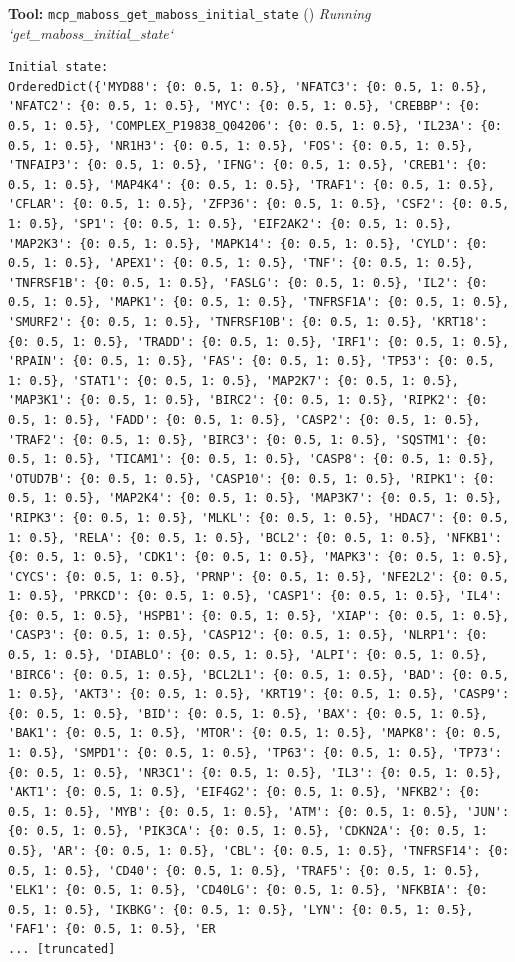\documentclass[11pt,a4paper]{article}
\begin{document}
\begin{toolokbox}
\textbf{Tool:} \texttt{mcp\_maboss\_get\_maboss\_initial\_state} (\checkmark)
\textit{Running `get\_maboss\_initial\_state`}
\begin{lstlisting}
Initial state:
OrderedDict({'MYD88': {0: 0.5, 1: 0.5}, 'NFATC3': {0: 0.5, 1: 0.5}, 'NFATC2': {0: 0.5, 1: 0.5}, 'MYC': {0: 0.5, 1: 0.5}, 'CREBBP': {0: 0.5, 1: 0.5}, 'COMPLEX_P19838_Q04206': {0: 0.5, 1: 0.5}, 'IL23A': {0: 0.5, 1: 0.5}, 'NR1H3': {0: 0.5, 1: 0.5}, 'FOS': {0: 0.5, 1: 0.5}, 'TNFAIP3': {0: 0.5, 1: 0.5}, 'IFNG': {0: 0.5, 1: 0.5}, 'CREB1': {0: 0.5, 1: 0.5}, 'MAP4K4': {0: 0.5, 1: 0.5}, 'TRAF1': {0: 0.5, 1: 0.5}, 'CFLAR': {0: 0.5, 1: 0.5}, 'ZFP36': {0: 0.5, 1: 0.5}, 'CSF2': {0: 0.5, 1: 0.5}, 'SP1': {0: 0.5, 1: 0.5}, 'EIF2AK2': {0: 0.5, 1: 0.5}, 'MAP2K3': {0: 0.5, 1: 0.5}, 'MAPK14': {0: 0.5, 1: 0.5}, 'CYLD': {0: 0.5, 1: 0.5}, 'APEX1': {0: 0.5, 1: 0.5}, 'TNF': {0: 0.5, 1: 0.5}, 'TNFRSF1B': {0: 0.5, 1: 0.5}, 'FASLG': {0: 0.5, 1: 0.5}, 'IL2': {0: 0.5, 1: 0.5}, 'MAPK1': {0: 0.5, 1: 0.5}, 'TNFRSF1A': {0: 0.5, 1: 0.5}, 'SMURF2': {0: 0.5, 1: 0.5}, 'TNFRSF10B': {0: 0.5, 1: 0.5}, 'KRT18': {0: 0.5, 1: 0.5}, 'TRADD': {0: 0.5, 1: 0.5}, 'IRF1': {0: 0.5, 1: 0.5}, 'RPAIN': {0: 0.5, 1: 0.5}, 'FAS': {0: 0.5, 1: 0.5}, 'TP53': {0: 0.5, 1: 0.5}, 'STAT1': {0: 0.5, 1: 0.5}, 'MAP2K7': {0: 0.5, 1: 0.5}, 'MAP3K1': {0: 0.5, 1: 0.5}, 'BIRC2': {0: 0.5, 1: 0.5}, 'RIPK2': {0: 0.5, 1: 0.5}, 'FADD': {0: 0.5, 1: 0.5}, 'CASP2': {0: 0.5, 1: 0.5}, 'TRAF2': {0: 0.5, 1: 0.5}, 'BIRC3': {0: 0.5, 1: 0.5}, 'SQSTM1': {0: 0.5, 1: 0.5}, 'TICAM1': {0: 0.5, 1: 0.5}, 'CASP8': {0: 0.5, 1: 0.5}, 'OTUD7B': {0: 0.5, 1: 0.5}, 'CASP10': {0: 0.5, 1: 0.5}, 'RIPK1': {0: 0.5, 1: 0.5}, 'MAP2K4': {0: 0.5, 1: 0.5}, 'MAP3K7': {0: 0.5, 1: 0.5}, 'RIPK3': {0: 0.5, 1: 0.5}, 'MLKL': {0: 0.5, 1: 0.5}, 'HDAC7': {0: 0.5, 1: 0.5}, 'RELA': {0: 0.5, 1: 0.5}, 'BCL2': {0: 0.5, 1: 0.5}, 'NFKB1': {0: 0.5, 1: 0.5}, 'CDK1': {0: 0.5, 1: 0.5}, 'MAPK3': {0: 0.5, 1: 0.5}, 'CYCS': {0: 0.5, 1: 0.5}, 'PRNP': {0: 0.5, 1: 0.5}, 'NFE2L2': {0: 0.5, 1: 0.5}, 'PRKCD': {0: 0.5, 1: 0.5}, 'CASP1': {0: 0.5, 1: 0.5}, 'IL4': {0: 0.5, 1: 0.5}, 'HSPB1': {0: 0.5, 1: 0.5}, 'XIAP': {0: 0.5, 1: 0.5}, 'CASP3': {0: 0.5, 1: 0.5}, 'CASP12': {0: 0.5, 1: 0.5}, 'NLRP1': {0: 0.5, 1: 0.5}, 'DIABLO': {0: 0.5, 1: 0.5}, 'ALPI': {0: 0.5, 1: 0.5}, 'BIRC6': {0: 0.5, 1: 0.5}, 'BCL2L1': {0: 0.5, 1: 0.5}, 'BAD': {0: 0.5, 1: 0.5}, 'AKT3': {0: 0.5, 1: 0.5}, 'KRT19': {0: 0.5, 1: 0.5}, 'CASP9': {0: 0.5, 1: 0.5}, 'BID': {0: 0.5, 1: 0.5}, 'BAX': {0: 0.5, 1: 0.5}, 'BAK1': {0: 0.5, 1: 0.5}, 'MTOR': {0: 0.5, 1: 0.5}, 'MAPK8': {0: 0.5, 1: 0.5}, 'SMPD1': {0: 0.5, 1: 0.5}, 'TP63': {0: 0.5, 1: 0.5}, 'TP73': {0: 0.5, 1: 0.5}, 'NR3C1': {0: 0.5, 1: 0.5}, 'IL3': {0: 0.5, 1: 0.5}, 'AKT1': {0: 0.5, 1: 0.5}, 'EIF4G2': {0: 0.5, 1: 0.5}, 'NFKB2': {0: 0.5, 1: 0.5}, 'MYB': {0: 0.5, 1: 0.5}, 'ATM': {0: 0.5, 1: 0.5}, 'JUN': {0: 0.5, 1: 0.5}, 'PIK3CA': {0: 0.5, 1: 0.5}, 'CDKN2A': {0: 0.5, 1: 0.5}, 'AR': {0: 0.5, 1: 0.5}, 'CBL': {0: 0.5, 1: 0.5}, 'TNFRSF14': {0: 0.5, 1: 0.5}, 'CD40': {0: 0.5, 1: 0.5}, 'TRAF5': {0: 0.5, 1: 0.5}, 'ELK1': {0: 0.5, 1: 0.5}, 'CD40LG': {0: 0.5, 1: 0.5}, 'NFKBIA': {0: 0.5, 1: 0.5}, 'IKBKG': {0: 0.5, 1: 0.5}, 'LYN': {0: 0.5, 1: 0.5}, 'FAF1': {0: 0.5, 1: 0.5}, 'ER
... [truncated]
\end{lstlisting}
\end{toolokbox}
\end{document}
